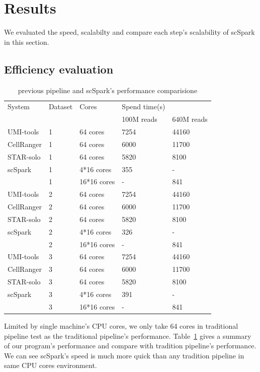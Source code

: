 \documentclass[conference]{IEEEtran}
\begin{document}
\section{Results}
We evaluated the speed, scalabilty and compare each step's scalability of scSpark in this section. 

\subsection{Efficiency evaluation}
\begin{table}
	\centering
	\caption{previous pipeline and scSpark's performance comparisione}\label{tab1}
	\resizebox{0.45\textwidth}{!} {
	\begin{tabular}{l | l | l | l  l}
		\hline
		System & Dataset & Cores & Spend time(s) \\
		& & & 100M reads & 640M reads  \\
		\hline
		UMI-tools & 1 & 64 cores & 7254 & 44160 \\
		CellRanger & 1 & 64 cores & 6000 & 11700 \\
		STAR-solo & 1 & 64 cores &  5820 & 8100 \\
		scSpark & 1 & 4*16 cores & 355 & - \\
		& 1 & 16*16 cores & - & 841 \\
		UMI-tools & 2 & 64 cores & 7254 & 44160 \\
		CellRanger & 2 & 64 cores & 6000 & 11700 \\
		STAR-solo & 2 & 64 cores &  5820 & 8100 \\
		scSpark & 2 & 4*16 cores & 326 & - \\
		& 2 & 16*16 cores & - & 841 \\
		UMI-tools & 3 & 64 cores & 7254 & 44160 \\
		CellRanger & 3 & 64 cores & 6000 & 11700 \\
		STAR-solo & 3 & 64 cores &  5820 & 8100 \\
		scSpark & 3 & 4*16 cores & 391 & - \\
		& 3 & 16*16 cores & - & 841 \\
		\hline
	\end{tabular}
	}
\end{table}
Limited by single machine's CPU cores, we only take 64 cores in traditional pipeline test as the traditional pipeline's performance.
Table~\ref{tab1} gives a summary of our program's performance and compare with tradition pipeline's performance.
We can see scSpark's speed is much more quick than any tradition pipeline in same CPU cores environment.
\end{document}
